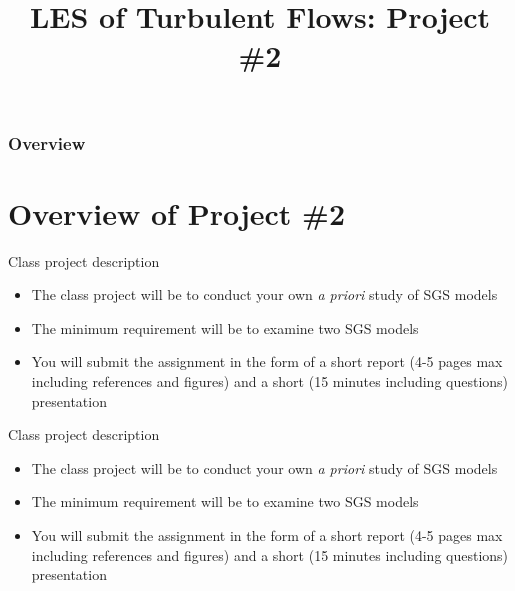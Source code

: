  
\title{LES of Turbulent Flows: Project \#2}



\begin{frame} 
  \titlepage
\end{frame}


\begin{frame}
\frametitle{Overview}
\tableofcontents
\end{frame}

\section{Overview of Project \#2} %
\begin{frame}{Class project description}
\begin{itemize}
	\item The class project will be to conduct your own {\it a priori} study of SGS models
	\item The minimum requirement will be to examine two SGS models
	\item You will submit the assignment in the form of a short report (4-5 pages max including references and figures) and a short (15 minutes including questions) presentation
	\end{itemize}
\end{frame}

\begin{frame}{Class project description}
\begin{itemize}
	\item The class project will be to conduct your own {\it a priori} study of SGS models
	\item The minimum requirement will be to examine two SGS models
	\item You will submit the assignment in the form of a short report (4-5 pages max including references and figures) and a short (15 minutes including questions) presentation
	\end{itemize}
\end{frame}

